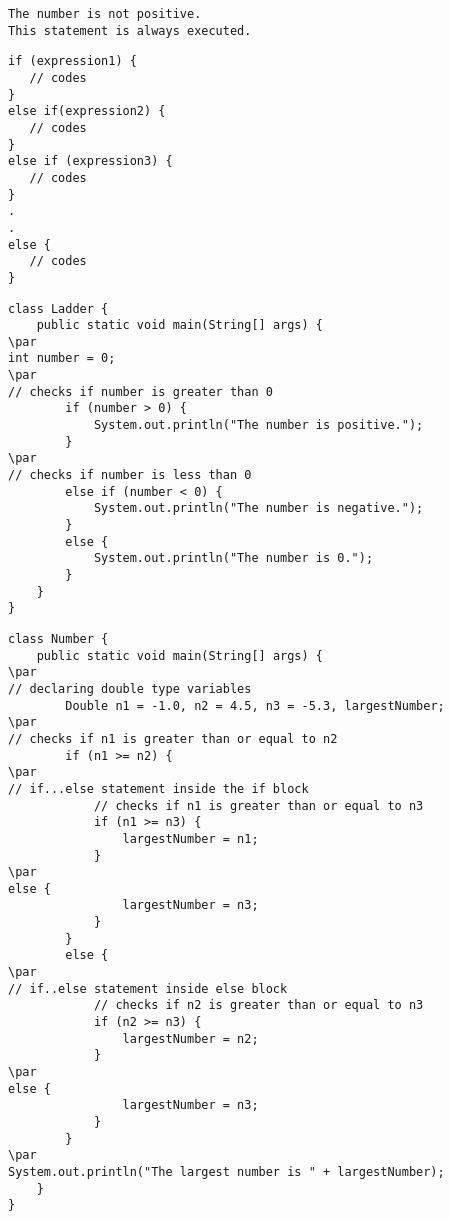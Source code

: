 \documentclass{book}
\def\lthtmlcheckvsize{\ifdim\ht\sizebox<\vsize 
  \ifdim\wd\sizebox<\hsize\expandafter\hfill\fi \expandafter\vfill
  \else\expandafter\vss\fi}%
\begin{document}
{\newpage\clearpage
{}%
\begin{lstlisting}
The number is not positive.
This statement is always executed.
\end{lstlisting}%
\lthtmlfigureZ
\lthtmlcheckvsize\clearpage}

{\newpage\clearpage
{}%
\begin{lstlisting}
if (expression1) {
   // codes
}
else if(expression2) {
   // codes
}
else if (expression3) {
   // codes
}
.
.
else {
   // codes
}
\end{lstlisting}%
\lthtmlfigureZ
\lthtmlcheckvsize\clearpage}

{\newpage\clearpage
{}%
\begin{lstlisting}
class Ladder {
    public static void main(String[] args) {   
\par
int number = 0;
\par
// checks if number is greater than 0	 
        if (number > 0) {
            System.out.println("The number is positive.");
        }
\par
// checks if number is less than 0
        else if (number < 0) {
            System.out.println("The number is negative.");
        }
        else {
            System.out.println("The number is 0.");
        } 
    }
}
\end{lstlisting}%
\lthtmlfigureZ
\lthtmlcheckvsize\clearpage}

{\newpage\clearpage
{}%
\begin{lstlisting}
class Number {
    public static void main(String[] args) {
\par
// declaring double type variables
        Double n1 = -1.0, n2 = 4.5, n3 = -5.3, largestNumber;
\par
// checks if n1 is greater than or equal to n2
        if (n1 >= n2) {
\par
// if...else statement inside the if block
            // checks if n1 is greater than or equal to n3
            if (n1 >= n3) {
                largestNumber = n1;
            }
\par
else {
                largestNumber = n3;
            }
        }
        else {
\par
// if..else statement inside else block
            // checks if n2 is greater than or equal to n3
            if (n2 >= n3) {
                largestNumber = n2;
            }
\par
else {
                largestNumber = n3;
            }
        }
\par
System.out.println("The largest number is " + largestNumber);
    }
}
\end{lstlisting}%
\lthtmlfigureZ
\lthtmlcheckvsize\clearpage}
\end{document}

